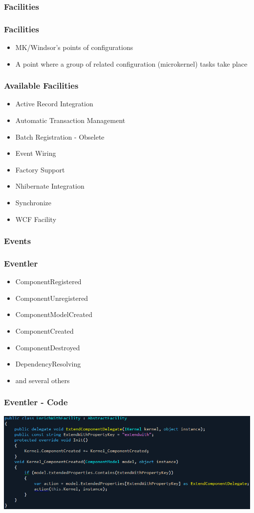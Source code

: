 \documentclass[turkish,handout]{beamer}
\begin{document}
			\subsubsection{Facilities}
				\frame
				{
					\frametitle{Facilities}
					\begin{itemize}
						\item<1-> MK/Windsor's points of configurations
						\item<2-> A point where a group of related configuration (microkernel) tasks take place
					\end{itemize}
			  }
			  \frame
				{
					\frametitle{Available Facilities}
					\begin{itemize}
						\item<1-> Active Record Integration
						\item<2-> Automatic Transaction Management
						\item<3-> Batch Registration - Obselete
						\item<4-> Event Wiring
						\item<5-> Factory Support
						\item<6-> Nhibernate Integration
						\item<7-> Synchronize
						\item<8-> WCF Facility
					\end{itemize}
				}
			\subsubsection{Events}
				\frame
				{
					\frametitle{Eventler}
					\begin{itemize}
						\item<1-> ComponentRegistered
						\item<2-> ComponentUnregistered
						\item<3-> ComponentModelCreated
						\item<4-> ComponentCreated
						\item<5-> ComponentDestroyed
						\item<6-> DependencyResolving
						\item<7-> and several others
  				\end{itemize}
  				
				}
				\frame
				{
					\frametitle{Eventler - Code}
					\begin{center}
						\includegraphics[scale=0.40]{images/enrichwithfacility.png}
  				\end{center}
				}
\end{document}
